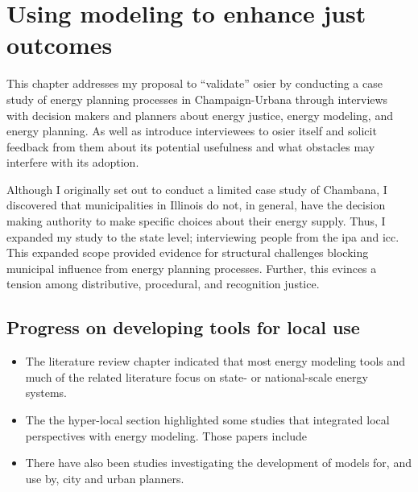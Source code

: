 


\chapter{Using modeling to enhance just outcomes}
\label{chapter:communities}
\iffalse


This chapter addresses my proposal to ``validate'' \ac{osier} by conducting a
case study of energy planning processes in Champaign-Urbana through interviews
with decision makers and planners about energy justice, energy modeling, and
energy planning. As well as introduce interviewees to \ac{osier} itself and
solicit feedback from them about its potential usefulness and what obstacles may
interfere with its adoption. 

Although I originally set out to conduct a limited case study of Chambana, I
discovered that municipalities in Illinois do not, in general, have the decision
making authority to make specific choices about their energy supply.
Thus, I expanded my study to the state level; interviewing people from the
\ac{ipa} and \ac{icc}. This expanded scope provided evidence for structural
challenges blocking municipal influence from energy planning processes. Further,
this evinces a tension among distributive, procedural, and recognition justice.

\section{Progress on developing tools for local use}

\begin{itemize}
    \item The literature review chapter indicated that most energy modeling tools
    and much of the related literature focus on state- or national-scale energy
    systems.
    \item The the hyper-local section highlighted some studies that integrated
    local perspectives with energy modeling. Those papers include 
    \cite{mckenna_combining_2018, johannsen_municipal_2023, fleischhacker_portfolio_2019}
    \item There have also been studies investigating the development of models for, and
    use by, city and urban planners.
\end{itemize}

